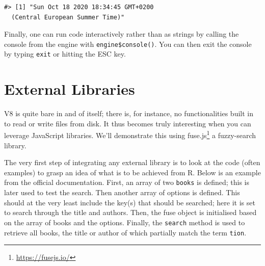\documentclass[10pt,]{krantz}
\makeatletter
\newenvironment{Shaded}{\begin{snugshade}}{\end{snugshade}}
\newcommand{\CommentTok}[1]{\textcolor[rgb]{0.37,0.37,0.37}{\textit{#1}}}
\newcommand{\KeywordTok}[1]{\textcolor[rgb]{0.27,0.27,0.27}{\textbf{#1}}}
\newcommand{\NormalTok}[1]{#1}
\newcommand{\OperatorTok}[1]{\textcolor[rgb]{0.43,0.43,0.43}{\textbf{#1}}}
\newcommand{\StringTok}[1]{\textcolor[rgb]{0.5,0.5,0.5}{#1}}
\renewcommand{\href}[2]{#2\footnote{\url{#1}}}
\newenvironment{kframe}{%
\medskip{}
\setlength{\fboxsep}{.8em}
 \def\at@end@of@kframe{}%
 \ifinner\ifhmode%
  \def\at@end@of@kframe{\end{minipage}}%
  \begin{minipage}{\columnwidth}%
 \fi\fi%
 \def\FrameCommand##1{\hskip\@totalleftmargin \hskip-\fboxsep
 \colorbox{shadecolor}{##1}\hskip-\fboxsep
     \hskip-\linewidth \hskip-\@totalleftmargin \hskip\columnwidth}%
 \MakeFramed {\advance\hsize-\width
   \@totalleftmargin\z@ \linewidth\hsize
   \@setminipage}}%
 {\par\unskip\endMakeFramed%
 \at@end@of@kframe}
\renewenvironment{Shaded}{\begin{kframe}}{\end{kframe}}
\makeatother
\begin{document}
\begin{Shaded}
\end{Shaded}

\begin{verbatim}
#> [1] "Sun Oct 18 2020 18:34:45 GMT+0200 
  (Central European Summer Time)"
\end{verbatim}

Finally, one can run code interactively rather than as strings by calling the console from the engine with \texttt{engine\$console()}. You can then exit the console by typing \texttt{exit} or hitting the ESC key.

\hypertarget{v8-external}{%
\section{External Libraries}\label{v8-external}}

V8 is quite bare in and of itself; there is, for instance, no functionalities built in to read or write files from disk. It thus becomes truly interesting when you can leverage JavaScript libraries. We'll demonstrate this using \href{https://fusejs.io/}{fuse.js} a fuzzy-search library.

The very first step of integrating any external library is to look at the code (often examples) to grasp an idea of what is to be achieved from R. Below is an example from the official documentation. First, an array of two \texttt{books} is defined; this is later used to test the search. Then another array of options is defined. This should at the very least include the key(s) that should be searched; here it is set to search through the title and authors. Then, the fuse object is initialised based on the array of books and the options. Finally, the \texttt{search} method is used to retrieve all books, the title or author of which partially match the term \texttt{tion}.
\end{document}
